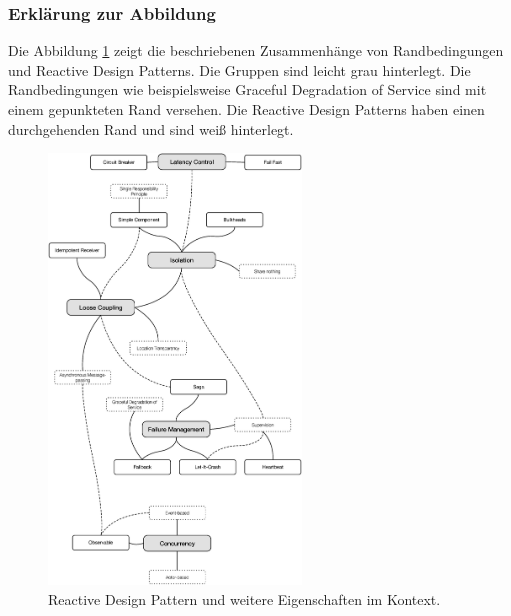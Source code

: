 \subsubsection{Erklärung zur Abbildung}
Die Abbildung \ref{fig:patterns-context} zeigt die beschriebenen Zusammenhänge von Randbedingungen und Reactive Design Patterns. Die Gruppen sind leicht grau hinterlegt. Die Randbedingungen wie beispielsweise Graceful Degradation of Service sind mit einem gepunkteten Rand versehen. Die Reactive Design Patterns haben einen durchgehenden Rand und sind weiß hinterlegt.

\begin{figure}[H]
 \centering
 \includegraphics[width=0.6\textwidth]{4-Hauptteil/context/context.eps}
 \caption{Reactive Design Pattern und weitere Eigenschaften im Kontext.}
 \label{fig:patterns-context}
\end{figure}